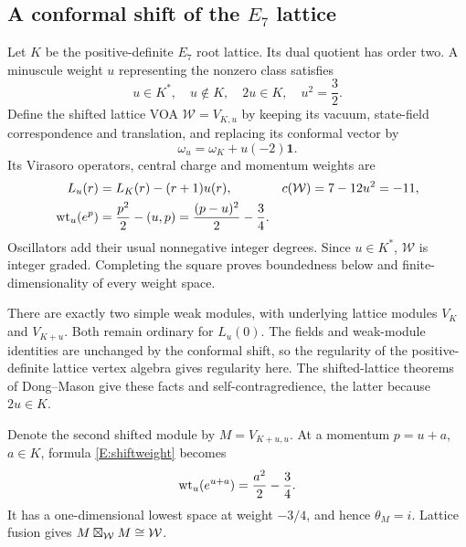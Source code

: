 \documentclass[11pt]{article}
\newcommand{\one}{\mathbf1}\newcommand{\D}{\mathcal D}\newcommand{\Dcat}{\mathcal D}
\numberwithin{equation}{section}
\begin{document}
\subsection{A conformal shift of the \texorpdfstring{$E_7$}{E7} lattice}
Let $K$ be the positive-definite $E_7$ root lattice. Its dual quotient has order two. A minuscule weight $u$ representing the nonzero class satisfies
\begin{equation}\label{E:u}
u\in K^*,\quad u\notin K,\quad 2u\in K,\quad u^2=\frac32.
\end{equation}
Define the shifted lattice VOA $\mathcal W=V_{K,u}$ by keeping its vacuum, state-field correspondence and translation, and replacing its conformal vector by
\begin{equation}\label{E:shift}
\omega_u=\omega_K+u(-2)\one.
\end{equation}
Its Virasoro operators, central charge and momentum weights are
\begin{align}
L_u(r)&=L_K(r)-(r+1)u(r),& c(\mathcal W)&=7-12u^2=-11,\label{E:shiftmodes}\\
\operatorname{wt}_u(e^p)&=\frac{p^2}{2}-(u,p)
=\frac{(p-u)^2}{2}-\frac34.\label{E:shiftweight}
\end{align}
Oscillators add their usual nonnegative integer degrees. Since $u\in K^*$, $\mathcal W$ is integer graded. Completing the square proves boundedness below and finite-dimensionality of every weight space.

There are exactly two simple weak modules, with underlying lattice modules $V_K$ and $V_{K+u}$. Both remain ordinary for $L_u(0)$. The fields and weak-module identities are unchanged by the conformal shift, so the regularity of the positive-definite lattice vertex algebra gives regularity here. The shifted-lattice theorems of Dong--Mason \cite[Theorems~3.1, 4.1 and 4.4]{E:DM} give these facts and self-contragredience, the latter because $2u\in K$.

Denote the second shifted module by $M=V_{K+u,u}$. At a momentum $p=u+a$, $a\in K$, formula \eqref{E:shiftweight} becomes
\begin{equation}\label{E:Mweight}
\operatorname{wt}_u(e^{u+a})=\frac{a^2}{2}-\frac34.
\end{equation}
It has a one-dimensional lowest space at weight $-3/4$, and hence $\theta_M=i$. Lattice fusion gives $M\boxtimes_{\mathcal W} M\cong \mathcal W$.
\end{document}
